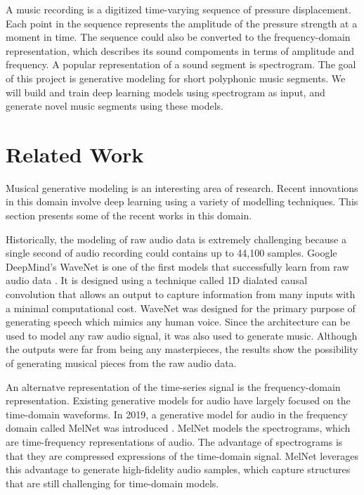 \documentclass[sigconf,authorversion]{acmart}
\begin{document}
A music recording is a digitized time-varying sequence of pressure displacement. Each point in the 
sequence represents the amplitude of the pressure strength at a moment in time. The sequence could 
also be converted to the frequency-domain representation, which describes its sound compoments in terms 
of amplitude and frequency. A popular representation of a sound segment is spectrogram. The goal of this 
project is generative modeling for short polyphonic music segments. We will build and train deep learning 
models using spectrogram as input, and generate novel music segments using these models.

\section{Related Work}

Musical generative modeling is an interesting area of research. Recent innovations in this domain involve
deep learning using a variety of modelling techniques. This section presents some of the recent works in
this domain.

Historically, the modeling of raw audio data is extremely challenging because a single second of audio recording
could contains up to 44,100 samples. Google DeepMind's WaveNet is one of the first models
that successfully learn from raw audio data \cite{oord_wavenet_2016}. It is designed using a technique called 
1D dialated causal convolution that allows an output to capture information from many inputs with a minimal
computational cost. WaveNet was designed for the primary purpose of generating speech which mimics any human voice.
Since the architecture can be used to model any raw audio signal, it was also used to generate music.
Although the outputs were far from being any masterpieces, the results show the possibility of generating musical
pieces from the raw audio data.

An alternatve representation of the time-series signal is the frequency-domain representation. Existing generative
models for audio have largely focused on the time-domain waveforms. In 2019, a generative model for audio in the
frequency domain called MelNet was introduced \cite{vasquez2019melnet}. MelNet models the spectrograms, which are
time-frequency representations of audio. The advantage of spectrograms is that they are compressed expressions of 
the time-domain signal. MelNet leverages this advantage to generate high-fidelity audio samples, which capture 
structures that are still challenging for time-domain models. 
\end{document}
